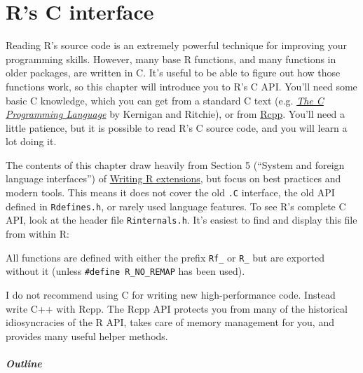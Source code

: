 \chapter{R's C interface}\label{c-api}

Reading R's source code is an extremely powerful technique for improving
your programming skills. However, many base R functions, and many
functions in older packages, are written in C. It's useful to be able to
figure out how those functions work, so this chapter will introduce you
to R's C API. You'll need some basic C knowledge, which you can get from
a standard C text (e.g.
\href{http://amzn.com/0131101633?tag=devtools-20}{\emph{The C
Programming Language}} by Kernigan and Ritchie), or from
\hyperref[rcpp]{Rcpp}. You'll need a little patience, but it is possible
to read R's C source code, and you will learn a lot doing it. 

The contents of this chapter draw heavily from Section 5 (``System and
foreign language interfaces'') of
\href{http://cran.r-project.org/doc/manuals/R-exts.html}{Writing R
extensions}, but focus on best practices and modern tools. This means it
does not cover the old \texttt{.C} interface, the old API defined in
\texttt{Rdefines.h}, or rarely used language features. To see R's
complete C API, look at the header file \texttt{Rinternals.h}. It's
easiest to find and display this file from within R:

\begin{Shaded}
\begin{Highlighting}[]
\StringTok{ }\NormalTok{(}\NormalTok{(}\NormalTok{), }\NormalTok{)}
\end{Highlighting}
\end{Shaded}

All functions are defined with either the prefix \texttt{Rf\_} or
\texttt{R\_} but are exported without it (unless
\texttt{\#define R\_NO\_REMAP} has been used).

I do not recommend using C for writing new high-performance code.
Instead write C++ with Rcpp. The Rcpp API protects you from many of the
historical idiosyncracies of the R API, takes care of memory management
for you, and provides many useful helper methods.

\paragraph{Outline}

